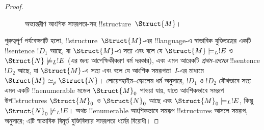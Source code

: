 \documentclass[../../../include/open-logic-section]{subfiles}
\begin{document}
\begin{proof}
\begin{figure}[h]
  \centering
  \caption{অভ্যন্তরীণ আংশিক সমরূপতা-সহ !!{structure}~$\Struct{M}$।}
\end{figure}

গুরুত্বপূর্ণ পর্যবেক্ষণটি হলো, !!{structure}~$\Struct{M}$-এর
!!{language}-এ স্বাভাবিক যুক্তিতন্ত্রের একটি !!{sentence} $!D_1$ আছে, যা
$\Struct{M}$-এ সত্য এবং বলে যে $\Struct{M} \models_L !E$ ও
$\Struct{N} \not\models_L !E$ (এর জন্য আপেক্ষিকীকরণ ধর্ম দরকার),
এবং এমন আরেকটি \emph{প্রথম-ক্রমের} !!{sentence} $!D_2$ আছে, যা
$\Struct{M}$-এ সত্য এবং বলে যে আংশিক সমরূপতা~$I$-এর মাধ্যমে
$\Struct{M} \simeq_p \Struct{N}$। লোয়েনহাইম--স্কোলেম ধর্ম অনুসারে,
$!D_1$ ও $!D_2$ যৌথভাবে সত্য এমন একটি !!a{enumerable} মডেল
$\Struct{M}_0$ পাওয়া যায়, যাতে আংশিকভাবে সমরূপ উপ!!{structure}s
$\Struct{M}_0$ ও $\Struct{N}_0$ আছে এবং
$\Struct{M}_0 \models_L !E$, কিন্তু $\Struct{N}_0
\not\models_L !E$। অথচ !!{enumerable} আংশিকভাবে সমরূপ !!{structure}s
আসলে সমরূপ,  অনুসারে; এটি স্বাভাবিক
বিমূর্ত যুক্তিবিদ্যার সমরূপতা ধর্মের বিরোধী।
\end{proof}
\end{document}
